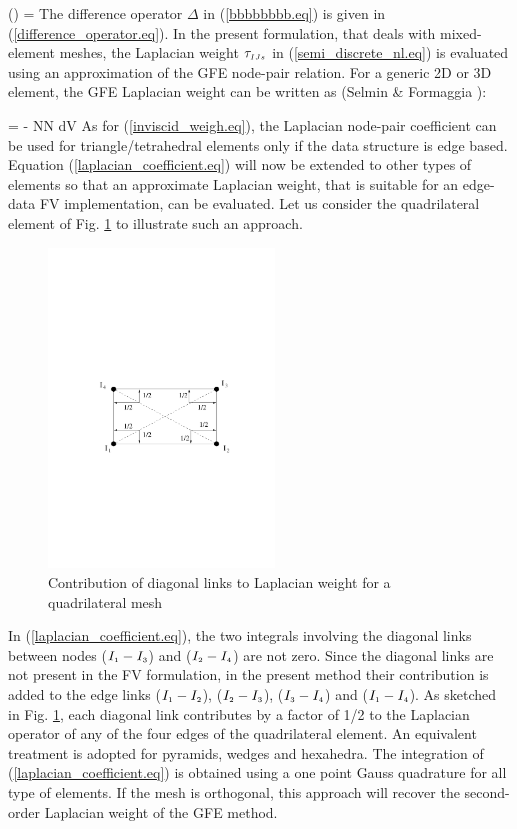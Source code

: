 \beq
  \left(\cdot\right) =
  \label{side_average.eq}
\eeq
%
 The difference operator $\Delta$ in (\ref{bbbbbbbb.eq})
 is given in (\ref{difference_operator.eq}).
 In the present formulation, that deals with mixed-element meshes, the
 Laplacian weight $\tau_{\mbox{\tiny $IJs$}}$ in (\ref{semi_discrete_nl.eq}) is evaluated using
 an approximation of the GFE node-pair relation.
 For a generic 2D or 3D element, the GFE Laplacian weight can be written as
 (Selmin \& Formaggia ):

%
\beq
  \tau{} = -\sum{} \int{}
  \nabl N\cdot\nabl N d{\cal V}
  \label{laplacian_coefficient.eq}
\eeq
%
 As for (\ref{inviscid_weigh.eq}), the Laplacian node-pair coefficient
 can be used for triangle/tetrahedral elements only if the data structure
 is edge based.
 Equation (\ref{laplacian_coefficient.eq}) will now be extended to other types
 of elements so that an approximate Laplacian weight, that is suitable for an edge-data
 FV implementation, can be evaluated.
 Let us consider the quadrilateral element of Fig. \ref{laplacian.fig} to
 illustrate such an approach.
%
\begin{figure}[ht]
\centerline{\includegraphics[width=60mm,clip=t]{CHAP_NONLIN/FIGURE/laplacian.pdf}}
\caption{Contribution of diagonal links to Laplacian weight for
         a quadrilateral mesh}
\label{laplacian.fig}
\end{figure}
%
 In (\ref{laplacian_coefficient.eq}), the two integrals involving the diagonal
 links between nodes ($I_{\mbox{\tiny $1$}} - I_{\mbox{\tiny $3$}}$) and  ($I_{\mbox{\tiny $2$}} - I_{\mbox{\tiny $4$}}$) are not zero.
 Since the diagonal links are not present in the FV formulation, in the present method
 their contribution is added to the edge links ($I_{\mbox{\tiny $1$}} - I_{\mbox{\tiny $2$}}$), ($I_{\mbox{\tiny $2$}} - I_{\mbox{\tiny $3$}}$),
 ($I_{\mbox{\tiny $3$}} - I_{\mbox{\tiny $4$}}$) and ($I_{\mbox{\tiny $1$}} - I_{\mbox{\tiny $4$}}$).
 As sketched in Fig. \ref{laplacian.fig}, each diagonal link contributes by
 a factor of 1/2 to the Laplacian operator of any of the four edges of
 the quadrilateral element.
 An equivalent treatment is adopted for pyramids, wedges and hexahedra.
 The integration of (\ref{laplacian_coefficient.eq}) is obtained using a
 one point Gauss quadrature for all type of elements.
 If the mesh is orthogonal, this approach will
 recover the second-order Laplacian weight of the GFE method.
%
%
